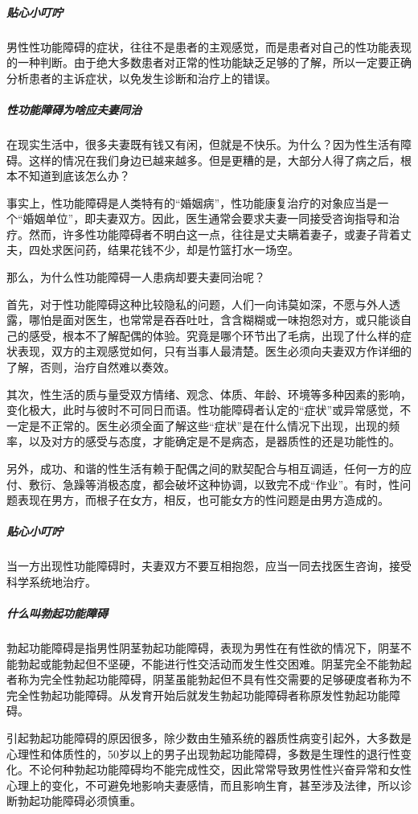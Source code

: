 \subparagraph{贴心小叮咛}

男性性功能障碍的症状，往往不是患者的主观感觉，而是患者对自己的性功能表现的一种判断。由于绝大多数患者对正常的性功能缺乏足够的了解，所以一定要正确分析患者的主诉症状，以免发生诊断和治疗上的错误。

\subparagraph{性功能障碍为啥应夫妻同治}

在现实生活中，很多夫妻既有钱又有闲，但就是不快乐。为什么？因为性生活有障碍。这样的情况在我们身边已越来越多。但是更糟的是，大部分人得了病之后，根本不知道到底该怎么办？

事实上，性功能障碍是人类特有的“婚姻病”，性功能康复治疗的对象应当是一个“婚姻单位”，即夫妻双方。因此，医生通常会要求夫妻一同接受咨询指导和治疗。然而，许多性功能障碍者不明白这一点，往往是丈夫瞒着妻子，或妻子背着丈夫，四处求医问药，结果花钱不少，却是竹篮打水一场空。

那么，为什么性功能障碍一人患病却要夫妻同治呢？

首先，对于性功能障碍这种比较隐私的问题，人们一向讳莫如深，不愿与外人透露，哪怕是面对医生，也常常是吞吞吐吐，含含糊糊或一味抱怨对方，或只能谈自己的感受，根本不了解配偶的体验。究竟是哪个环节出了毛病，出现了什么样的症状表现，双方的主观感觉如何，只有当事人最清楚。医生必须向夫妻双方作详细的了解，否则，治疗自然难以奏效。

其次，性生活的质与量受双方情绪、观念、体质、年龄、环境等多种因素的影响，变化极大，此时与彼时不可同日而语。性功能障碍者认定的“症状”或异常感觉，不一定是不正常的。医生必须全面了解这些“症状”是在什么情况下出现，出现的频率，以及对方的感受与态度，才能确定是不是病态，是器质性的还是功能性的。

另外，成功、和谐的性生活有赖于配偶之间的默契配合与相互调适，任何一方的应付、敷衍、急躁等消极态度，都会破坏这种协调，以致完不成“作业”。有时，性问题表现在男方，而根子在女方，相反，也可能女方的性问题是由男方造成的。

\subparagraph{贴心小叮咛}

当一方出现性功能障碍时，夫妻双方不要互相抱怨，应当一同去找医生咨询，接受科学系统地治疗。

\subparagraph{什么叫勃起功能障碍}

勃起功能障碍是指男性阴茎勃起功能障碍，表现为男性在有性欲的情况下，阴茎不能勃起或能勃起但不坚硬，不能进行性交活动而发生性交困难。阴茎完全不能勃起者称为完全性勃起功能障碍，阴茎虽能勃起但不具有性交需要的足够硬度者称为不完全性勃起功能障碍。从发育开始后就发生勃起功能障碍者称原发性勃起功能障碍。

引起勃起功能障碍的原因很多，除少数由生殖系统的器质性病变引起外，大多数是心理性和体质性的，50岁以上的男子出现勃起功能障碍，多数是生理性的退行性变化。不论何种勃起功能障碍均不能完成性交，因此常常导致男性性兴奋异常和女性心理上的变化，不可避免地影响夫妻感情，而且影响生育，甚至涉及法律，所以诊断勃起功能障碍必须慎重。

